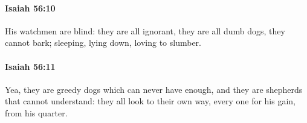 		\paragraph{Isaiah 56:10} %
			\label{ISAIAH-56-10}

			His watchmen are blind: they are all ignorant, they are all dumb dogs, they cannot bark; sleeping, lying down, loving to slumber.


		\paragraph{Isaiah 56:11} %
			\label{ISAIAH-56-11}

			Yea, they are greedy dogs which can never have enough, and they are shepherds that cannot understand: they all look to their own way, every one for his gain, from his quarter.


